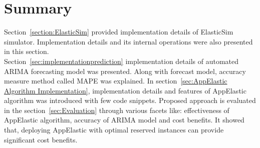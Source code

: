 \section{Summary}
\label{sec:Summary}
Section~\ref{section:ElasticSim} provided implementation details of ElasticSim simulator. Implementation details and its internal operations were also presented in this section.
\\
Section~\ref{sec:implementationprediction} implementation details of automated ARIMA forecasting model was presented. Along with forecast model, accuracy measure method called MAPE was explained. In section~\ref{sec:AppElastic Algorithm Implementation}, implementation details and features of AppElastic algorithm was introduced with few code snippets. Proposed approach is evaluated in the section~\ref{sec:Evaluation} through various facets like: effectiveness of AppElastic algorithm, accuracy of ARIMA model and cost benefits. It showed that, deploying AppElastic with optimal reserved instances can provide significant cost benefits.
